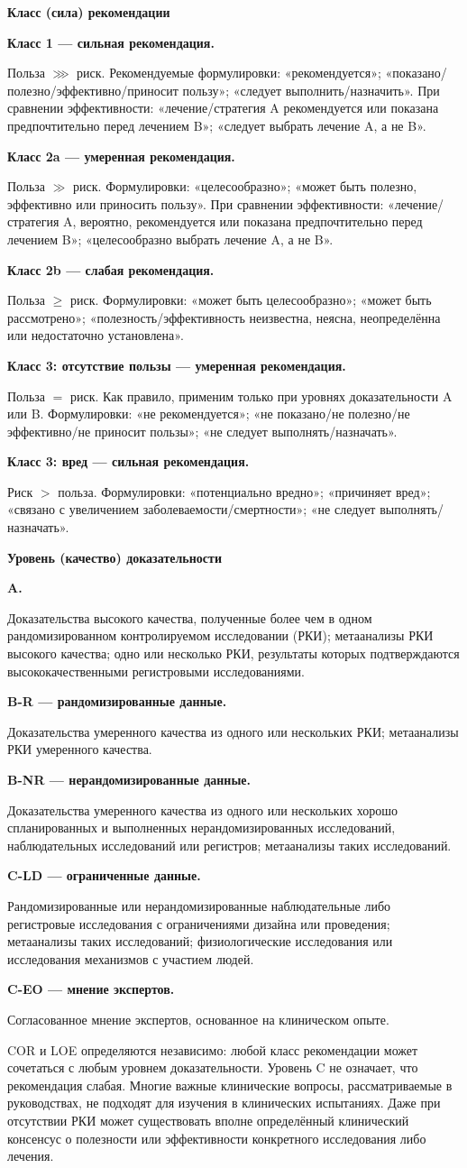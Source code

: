 \documentclass[11pt,a4paper]{article}
\newcommand{\heading}[1]{\par\medskip\textbf{#1}\par}
\begin{document}
\heading{Класс (сила) рекомендации}
\heading{Класс 1 --- сильная рекомендация.} Польза $\ggg$ риск. Рекомендуемые формулировки: «рекомендуется»; «показано/полезно/эффективно/приносит пользу»; «следует выполнить/назначить». При сравнении эффективности: «лечение/стратегия A рекомендуется или показана предпочтительно перед лечением B»; «следует выбрать лечение A, а не B».
\heading{Класс 2a --- умеренная рекомендация.} Польза $\gg$ риск. Формулировки: «целесообразно»; «может быть полезно, эффективно или приносить пользу». При сравнении эффективности: «лечение/стратегия A, вероятно, рекомендуется или показана предпочтительно перед лечением B»; «целесообразно выбрать лечение A, а не B».
\heading{Класс 2b --- слабая рекомендация.} Польза $\geq$ риск. Формулировки: «может быть целесообразно»; «может быть рассмотрено»; «полезность/эффективность неизвестна, неясна, неопределённа или недостаточно установлена».
\heading{Класс 3: отсутствие пользы --- умеренная рекомендация.} Польза $=$ риск. Как правило, применим только при уровнях доказательности A или B. Формулировки: «не рекомендуется»; «не показано/не полезно/не эффективно/не приносит пользы»; «не следует выполнять/назначать».
\heading{Класс 3: вред --- сильная рекомендация.} Риск $>$ польза. Формулировки: «потенциально вредно»; «причиняет вред»; «связано с увеличением заболеваемости/смертности»; «не следует выполнять/назначать».

\heading{Уровень (качество) доказательности}
\heading{A.} Доказательства высокого качества, полученные более чем в одном рандомизированном контролируемом исследовании (РКИ); метаанализы РКИ высокого качества; одно или несколько РКИ, результаты которых подтверждаются высококачественными регистровыми исследованиями.
\heading{B-R --- рандомизированные данные.} Доказательства умеренного качества из одного или нескольких РКИ; метаанализы РКИ умеренного качества.
\heading{B-NR --- нерандомизированные данные.} Доказательства умеренного качества из одного или нескольких хорошо спланированных и выполненных нерандомизированных исследований, наблюдательных исследований или регистров; метаанализы таких исследований.
\heading{C-LD --- ограниченные данные.} Рандомизированные или нерандомизированные наблюдательные либо регистровые исследования с ограничениями дизайна или проведения; метаанализы таких исследований; физиологические исследования или исследования механизмов с участием людей.
\heading{C-EO --- мнение экспертов.} Согласованное мнение экспертов, основанное на клиническом опыте.

COR и LOE определяются независимо: любой класс рекомендации может сочетаться с любым уровнем доказательности. Уровень C не означает, что рекомендация слабая. Многие важные клинические вопросы, рассматриваемые в руководствах, не подходят для изучения в клинических испытаниях. Даже при отсутствии РКИ может существовать вполне определённый клинический консенсус о полезности или эффективности конкретного исследования либо лечения.
\end{document}
